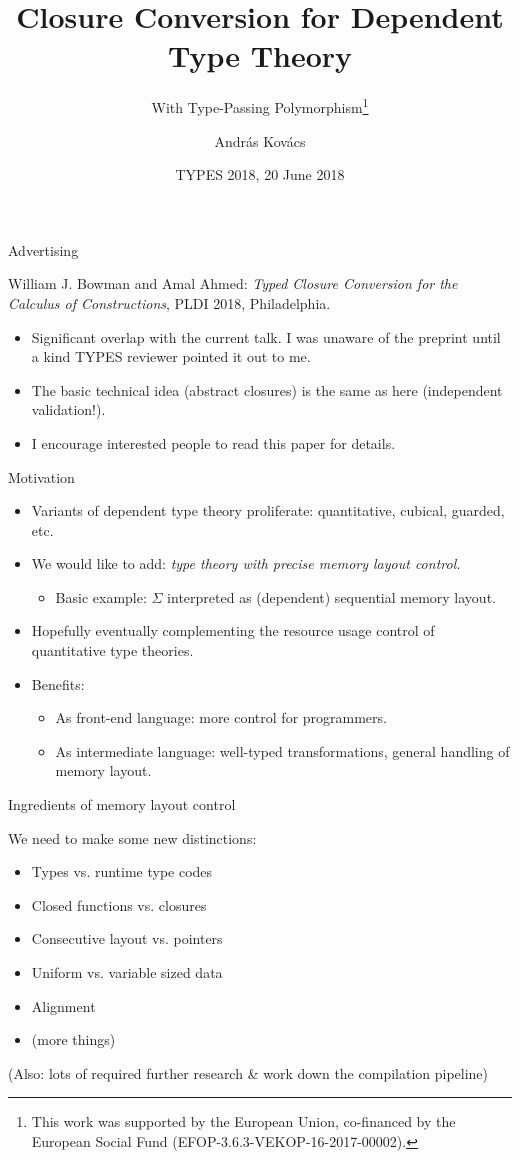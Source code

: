 \documentclass{beamer}
\title{Closure Conversion for Dependent Type Theory}
\subtitle{With Type-Passing Polymorphism\thanks{This work was supported by the European Union, co-financed by the European
Social Fund (EFOP-3.6.3-VEKOP-16-2017-00002).}}
\author{András Kovács}
\institute{Eötvös Loránd University, Budapest}
\date{TYPES 2018, 20 June 2018}
\begin{document}
\frame{\titlepage}


\begin{frame}{Advertising}


William J. Bowman and Amal Ahmed: \emph{Typed Closure Conversion for the Calculus of Constructions}, PLDI 2018, Philadelphia.

\begin{itemize}
\item
Significant overlap with the current talk. I was unaware of the
preprint until a kind TYPES reviewer pointed it out to me.
\item
The basic technical idea (abstract closures) is the same as here (independent validation!).
\item
I encourage interested people to read this paper for details.
\end{itemize}

\end{frame}

\begin{frame}{Motivation}
  \begin{itemize}
  \item
    Variants of dependent type theory proliferate: quantitative, cubical, guarded, etc.
  \item
    We would like to add: \emph{type theory with precise memory layout control.}
    \begin{itemize} \item Basic example: $\Sigma$ interpreted as (dependent) sequential memory layout.
    \end{itemize}
  \item
    Hopefully eventually complementing the resource usage control of quantitative
    type theories.
  \item Benefits:
    \begin{itemize}
    \item As front-end language: more control for programmers.
    \item As intermediate language: well-typed transformations, general handling of memory layout.
    \end{itemize}
  \end{itemize}
\end{frame}

\begin{frame}{Ingredients of memory layout control}

  We need to make some new distinctions:

  \begin{itemize}
  \item Types vs. runtime type codes
  \item Closed functions vs. closures
  \item Consecutive layout vs. pointers
  \item Uniform vs. variable sized data
  \item Alignment
  \item (more things)
  \end{itemize}
(Also: lots of required further research \& work down the compilation pipeline)
\end{frame}
\end{document}

